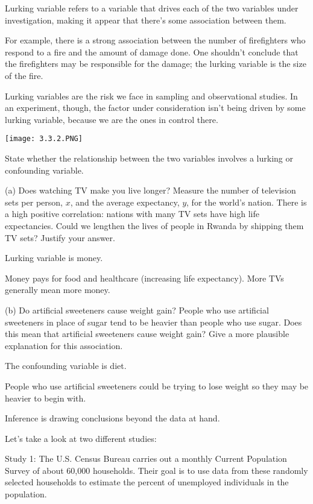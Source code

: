 \documentclass[../stats.tex]{subfiles}
\begin{document}
Lurking variable refers to a variable that drives each of the two variables under investigation, making it appear that there's some association between them.

For example, there is a strong association between the number of firefighters who respond to a fire and the amount of damage done. One shouldn't conclude that the firefighters may 
be responsible for the damage; the lurking variable is the size of the fire. 

Lurking variables are the risk we face in sampling and observational studies. In an experiment, though, the factor under consideration isn't being driven by some lurking variable, because we are the ones in control there.
\begin{center}
    \texttt{[image: 3.3.2.PNG]}
\end{center}

\begin{example}
    State whether the relationship between the two variables involves a lurking or confounding variable.

    (a) Does watching TV make you live longer? Measure the number of television sets per person, $x$, and the average expectancy, $y$, for the world's nation. There is a high positive correlation: nations with many TV sets have high life expectancies. Could we lengthen the lives of people in Rwanda by shipping them TV sets? Justify your answer.

    Lurking variable is money.

    Money pays for food and healthcare (increasing life expectancy). More TVs generally mean more money.

    (b) Do artificial sweeteners cause weight gain? People who use artificial sweeteners in place of sugar tend to be heavier than people who use sugar. Does this mean that artificial sweeteners cause weight gain? Give a more plausible explanation for this association.

    The confounding variable is diet.

    People who use artificial sweeteners could be trying to lose weight so they may be heavier to begin with.
\end{example}

Inference is drawing conclusions beyond the data at hand.

Let's take a look at two different studies:

Study 1: The U.S. Census Bureau carries out a monthly Current Population Survey of about 60,000 households. Their goal is to use data from these randomly selected households to estimate the percent of unemployed individuals in the population.
\end{document}

